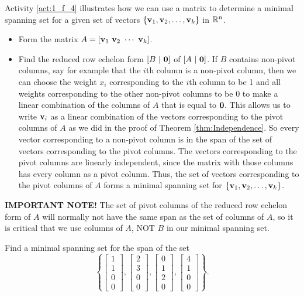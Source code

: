 


Activity \ref{act:1_f_4} illustrates how we can use a matrix to determine a minimal spanning set for a given set of vectors $\{\mathbf{v}_1, \mathbf{v}_2, \ldots, \mathbf{v}_k\}$ in $\mathbb{R}^n$.
\begin{itemize}
\item Form the matrix $A = [\vv_1 \ \vv_2 \ \cdots \ \vv_k]$.
\item Find the reduced row echelon form $[B \ | \ \vzero]$ of $[A \ | \ \vzero]$. If $B$ contains non-pivot columns, say for example that the $i$th column is a non-pivot column, then we can choose the weight $x_i$ corresponding to the $i$th column to be 1 and all weights corresponding to the other non-pivot columns to be 0 to make a linear combination of the columns of $A$ that is equal to $\mathbf{0}$. This allows us to write $\mathbf{v}_i$ as a linear combination of the vectors corresponding to the pivot columns of $A$ as we did in the proof of Theorem \ref{thm:Independence}. So every vector corresponding to a non-pivot column is in the span of the set of vectors corresponding to the pivot columns. The vectors corresponding to the pivot columns are linearly independent, since the matrix with those columns has every column as a pivot column. Thus, the set of vectors corresponding to the pivot columns of $A$ forms a minimal spanning set for $\{\mathbf{v}_1, \mathbf{v}_2, \ldots, \mathbf{v}_k\}$.
\end{itemize}

\noindent \textbf{IMPORTANT NOTE!} The set of pivot columns of the reduced row echelon form of $A$ will normally not have the same span as the set of columns of $A$, so it is critical that we use columns of $A$, NOT $B$ in our minimal spanning set.



\begin{activity} \label{act:1_f_5} Find a minimal spanning set for the span of the set 
\[\left\{ \left[ \begin{array}{c} 1 \\ 1 \\ 0 \\ 0 \end{array} \right], \left[ \begin{array}{c} 2 \\ 3 \\ 0 \\ 0 \end{array} \right], \left[ \begin{array}{c} 0 \\ 1 \\ 2 \\ 0 \end{array} \right], \left[ \begin{array}{c} 4 \\ 1 \\ 0 \\ 0 \end{array} \right] \right\}.\] 



\end{activity}

